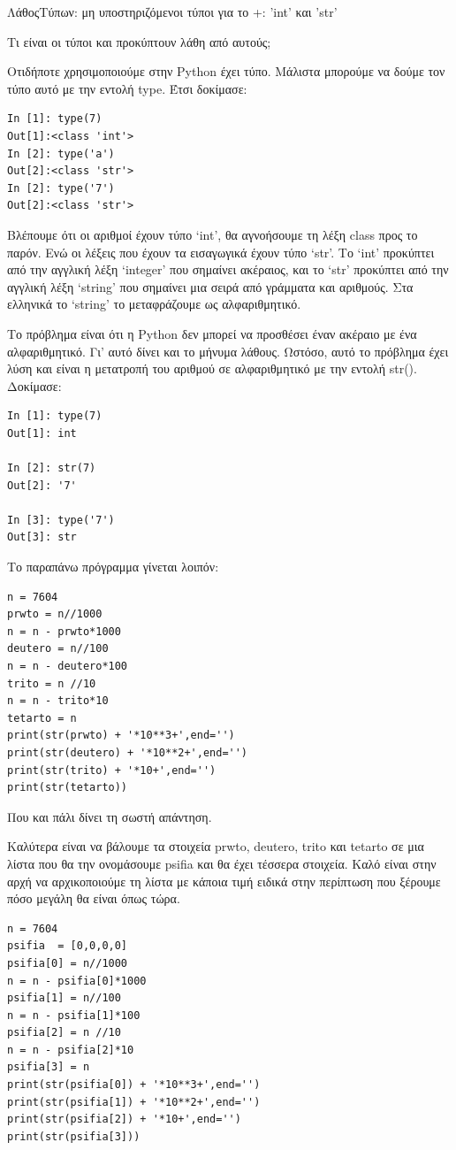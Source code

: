 \documentclass[b5paper,11pt,twoside,openleft]{memoir}
\begin{document}
ΛάθοςΤύπων: μη υποστηριζόμενοι τύποι για το +: 'int' και 'str'

Τι είναι οι τύποι και προκύπτουν λάθη από αυτούς;

Οτιδήποτε χρησιμοποιούμε στην Python έχει τύπο. Μάλιστα μπορούμε να δούμε τον τύπο αυτό με την εντολή type. Έτσι δοκίμασε:
\begin{lstlisting}
In [1]: type(7)
Out[1]:<class 'int'>
In [2]: type('a')
Out[2]:<class 'str'>
In [2]: type('7')
Out[2]:<class 'str'>
\end{lstlisting} 

Βλέπουμε ότι οι αριθμοί έχουν τύπο `int', θα αγνοήσουμε τη λέξη class προς το παρόν. Ενώ οι λέξεις που έχουν τα εισαγωγικά έχουν τύπο `str'. Το `int' προκύπτει από την αγγλική λέξη `integer' που σημαίνει ακέραιος, και το `str' προκύπτει από την αγγλική λέξη `string' που σημαίνει μια σειρά από γράμματα και αριθμούς. Στα ελληνικά το `string' το μεταφράζουμε ως αλφαριθμητικό.

Το πρόβλημα είναι ότι η Python δεν μπορεί να προσθέσει έναν ακέραιο με ένα αλφαριθμητικό. Γι' αυτό δίνει και το μήνυμα λάθους. Ωστόσο, αυτό το πρόβλημα έχει λύση και είναι η μετατροπή του αριθμού σε αλφαριθμητικό με την εντολή str().
Δοκίμασε:
\begin{lstlisting}
In [1]: type(7)
Out[1]: int

In [2]: str(7)
Out[2]: '7'

In [3]: type('7')
Out[3]: str
\end{lstlisting} 

Το παραπάνω πρόγραμμα γίνεται λοιπόν:
\begin{lstlisting}
n = 7604
prwto = n//1000
n = n - prwto*1000
deutero = n//100
n = n - deutero*100
trito = n //10
n = n - trito*10
tetarto = n
print(str(prwto) + '*10**3+',end='')
print(str(deutero) + '*10**2+',end='')
print(str(trito) + '*10+',end='')
print(str(tetarto))
\end{lstlisting}

Που και πάλι δίνει τη σωστή απάντηση.

Καλύτερα είναι να βάλουμε τα στοιχεία prwto, deutero, trito και tetarto σε μια λίστα που θα την ονομάσουμε psifia και θα έχει τέσσερα στοιχεία. Καλό είναι στην αρχή να αρχικοποιούμε τη λίστα με κάποια τιμή ειδικά στην περίπτωση που ξέρουμε πόσο μεγάλη θα είναι όπως τώρα.

\begin{lstlisting}
n = 7604
psifia  = [0,0,0,0]
psifia[0] = n//1000
n = n - psifia[0]*1000
psifia[1] = n//100
n = n - psifia[1]*100
psifia[2] = n //10
n = n - psifia[2]*10
psifia[3] = n
print(str(psifia[0]) + '*10**3+',end='')
print(str(psifia[1]) + '*10**2+',end='')
print(str(psifia[2]) + '*10+',end='')
print(str(psifia[3]))
\end{lstlisting}
\end{document}
